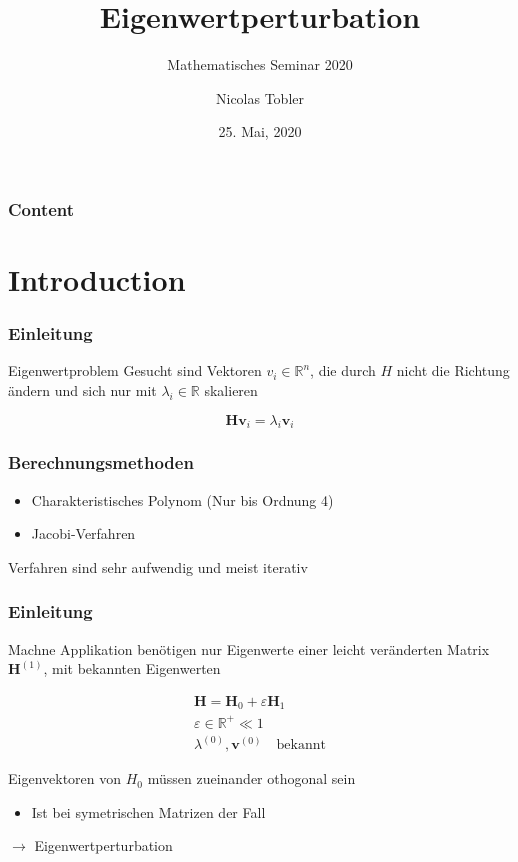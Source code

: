 \documentclass[ngerman, aspectratio=169]{beamer}
\title{Eigenwertperturbation}
\subtitle{Mathematisches Seminar 2020}
\author{Nicolas Tobler}
\institute{HSR Hochschule für Technik Rapperswil}
\date{25. Mai, 2020}
\begin{document}
	
	\begin{frame}
		\titlepage
	\end{frame}
	
	\begin{frame}
		\frametitle{Content}
		\tableofcontents
	\end{frame}
	
	\section{Introduction}


	\begin{frame}
		\frametitle{Einleitung}

		\begin{block}{Eigenwertproblem}
			Gesucht sind Vektoren $v_i \in \mathbb {R}^{n} $, die durch $H$ nicht die Richtung ändern und sich nur mit $\lambda_i \in \mathbb R$ skalieren
			
            \begin{equation}
                \bm H \bm v_i = \lambda_i \bm v_i
			\end{equation}
        \end{block}

	\end{frame}

	\begin{frame}
		\frametitle{Berechnungsmethoden}

		\begin{itemize}
			\item Charakteristisches Polynom (Nur bis Ordnung 4)
			\item Jacobi-Verfahren
		\end{itemize}

		Verfahren sind sehr aufwendig und meist iterativ

	\end{frame}

	\begin{frame}
		\frametitle{Einleitung}
		
		

		\begin{block}{Machne Applikation benötigen nur Eigenwerte einer leicht veränderten Matrix $\bm H^{(1)}$, mit bekannten Eigenwerten}
			
			\begin{gather*}
				\bm H = \bm H_0 + \varepsilon \bm H_1 \\
				\varepsilon \in \mathbb{R^+} \ll 1 \\
				\lambda^{(0)}, \bm v^{(0)} \quad \text{bekannt}
			\end{gather*}

			Eigenvektoren von $H_0$ müssen zueinander othogonal sein
			\begin{itemize}
				\item Ist bei symetrischen Matrizen der Fall
			\end{itemize}
			

            $\rightarrow$ Eigenwertperturbation
        \end{block}

	\end{frame}
\end{document}
